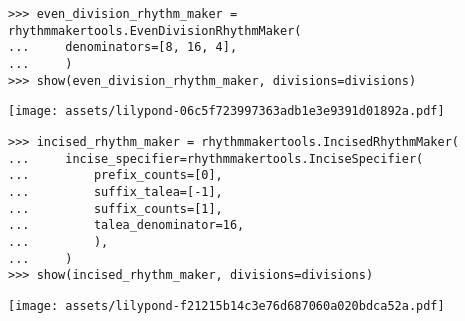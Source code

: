 \begin{comment}
<abjad>
even_division_rhythm_maker = rhythmmakertools.EvenDivisionRhythmMaker(
    denominators=[8, 16, 4],
    )
show(even_division_rhythm_maker, divisions=divisions)
</abjad>
\end{comment}

\begin{singlespacing}
\vspace{-0.5\baselineskip}
\begin{lstlisting}
>>> even_division_rhythm_maker = rhythmmakertools.EvenDivisionRhythmMaker(
...     denominators=[8, 16, 4],
...     )
>>> show(even_division_rhythm_maker, divisions=divisions)
\end{lstlisting}
\noindent\texttt{[image: assets/lilypond-06c5f723997363adb1e3e9391d01892a.pdf]}
\end{singlespacing}

\begin{comment}
<abjad>
incised_rhythm_maker = rhythmmakertools.IncisedRhythmMaker(
    incise_specifier=rhythmmakertools.InciseSpecifier(
        prefix_counts=[0],
        suffix_talea=[-1],
        suffix_counts=[1],
        talea_denominator=16,
        ),
    )
show(incised_rhythm_maker, divisions=divisions)
</abjad>
\end{comment}

\begin{singlespacing}
\vspace{-0.5\baselineskip}
\begin{lstlisting}
>>> incised_rhythm_maker = rhythmmakertools.IncisedRhythmMaker(
...     incise_specifier=rhythmmakertools.InciseSpecifier(
...         prefix_counts=[0],
...         suffix_talea=[-1],
...         suffix_counts=[1],
...         talea_denominator=16,
...         ),
...     )
>>> show(incised_rhythm_maker, divisions=divisions)
\end{lstlisting}
\noindent\texttt{[image: assets/lilypond-f21215b14c3e76d687060a020bdca52a.pdf]}
\end{singlespacing}

\begin{comment}
<abjad>
talea_rhythm_maker = rhythmmakertools.TaleaRhythmMaker(
    talea=rhythmmakertools.Talea(
        counts=[1, 2, 3, 4],
        denominator=16,
        ),
    )
show(talea_rhythm_maker, divisions=divisions)
</abjad>
\end{comment}

